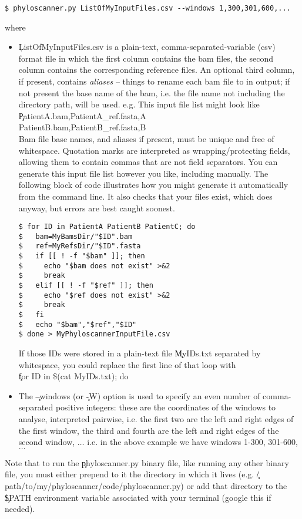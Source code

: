 \begin{verbatim}
$ phyloscanner.py ListOfMyInputFiles.csv --windows 1,300,301,600,...
\end{verbatim}
where
\begin{itemize}
\item \c{ListOfMyInputFiles.csv} is a plain-text, comma-separated-variable (csv) format file in which the first column contains the bam files, the second column contains the corresponding reference files.
An optional third column, if present, contains {\it aliases} -- things to rename each bam file to in \p output; if not present the base name of the bam, i.e. the file name not including the directory path, will be used.
e.g. This input file list might look like\\
\c{PatientA.bam,PatientA\_ref.fasta,A\\
PatientB.bam,PatientB\_ref.fasta,B}\\
Bam file base names, and aliases if present, must be unique and free of whitespace.
Quotation marks are interpreted as wrapping/protecting fields, allowing them to contain commas that are not field separators.
You can generate this input file list however you like, including manually.
The following block of code illustrates how you might generate it automatically from the command line.
It also checks that your files exist, which \p does anyway, but errors are best caught soonest.
\begin{verbatim}
$ for ID in PatientA PatientB PatientC; do
$   bam=MyBamsDir/"$ID".bam
$   ref=MyRefsDir/"$ID".fasta
$   if [[ ! -f "$bam" ]]; then
$     echo "$bam does not exist" >&2
$     break
$   elif [[ ! -f "$ref" ]]; then
$     echo "$ref does not exist" >&2
$     break
$   fi
$   echo "$bam","$ref","$ID"
$ done > MyPhyloscannerInputFile.csv
\end{verbatim}
If those IDs were stored in a plain-text file \c{MyIDs.txt} separated by whitespace, you could replace the first line of that loop with\\
\c{for ID in \$(cat MyIDs.txt); do}
\item The \c{--windows} (or \c{-W}) option is used to specify an even number of comma-separated positive integers: these are the coordinates of the windows to analyse, interpreted pairwise, i.e. the first two are the left and right edges of the first window, the third and fourth are the left and right edges of the second window, $\ldots$ i.e. in the above example we have windows 1-300, 301-600, $\ldots$
\end{itemize}
Note that to run the \c{phyloscanner.py} binary file, like running any other binary file, you must either prepend to it the directory in which it lives (e.g. \c{/path/to/my/phyloscanner/code/phyloscanner.py}) or add that directory to the \c{\$PATH} environment variable associated with your terminal (google this if needed). 


